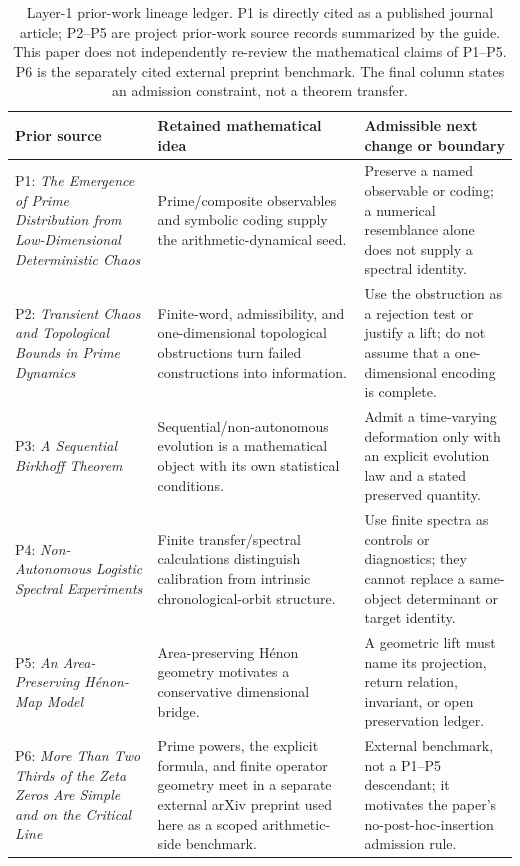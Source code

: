 \begin{table}[H]
\centering
\caption{Layer-1 prior-work lineage ledger. P1 is directly cited as a
published journal article; P2--P5 are project prior-work source records
summarized by the guide. This paper does not independently re-review the
mathematical claims of P1--P5. P6 is the separately cited external preprint
benchmark. The final column states an admission constraint, not a theorem
transfer.}
\label{tab:lineage-ledger}
\footnotesize
\renewcommand{\arraystretch}{1.05}
\begin{tabularx}{\linewidth}{@{}p{.30\linewidth}p{.34\linewidth}Y@{}}
\toprule
\textbf{Prior source} & \textbf{Retained mathematical idea} & \textbf{Admissible next change or boundary} \\
\midrule
P1: \emph{The Emergence of Prime Distribution from Low-Dimensional Deterministic Chaos}
\citep{Wang2026PrimeChaos} &
Prime/composite observables and symbolic coding supply the arithmetic-dynamical
seed. & Preserve a named observable or coding; a numerical resemblance alone
does not supply a spectral identity. \\
P2: \emph{Transient Chaos and Topological Bounds in Prime Dynamics} &
Finite-word, admissibility, and one-dimensional topological obstructions turn
failed constructions into information. & Use the obstruction as a rejection
test or justify a lift; do not assume that a one-dimensional encoding is
complete. \\
P3: \emph{A Sequential Birkhoff Theorem} &
Sequential/non-autonomous evolution is a mathematical object with its own
statistical conditions. & Admit a time-varying deformation only with an explicit
evolution law and a stated preserved quantity. \\
P4: \emph{Non-Autonomous Logistic Spectral Experiments} &
Finite transfer/spectral calculations distinguish calibration from intrinsic
chronological-orbit structure. & Use finite spectra as controls or diagnostics;
they cannot replace a same-object determinant or target identity. \\
P5: \emph{An Area-Preserving H\'{e}non-Map Model} &
Area-preserving H\'{e}non geometry motivates a conservative dimensional bridge.
& A geometric lift must name its projection, return relation, invariant, or
open preservation ledger. \\
P6: \emph{More Than Two Thirds of the Zeta Zeros Are Simple and on the Critical
Line} \citep{AlpogeFurman2026} &
Prime powers, the explicit formula, and finite operator geometry meet in a
separate external arXiv preprint used here as a scoped arithmetic-side
benchmark. & External benchmark, not a P1--P5 descendant; it motivates the
paper's no-post-hoc-insertion admission rule. \\
\bottomrule
\end{tabularx}
\end{table}

